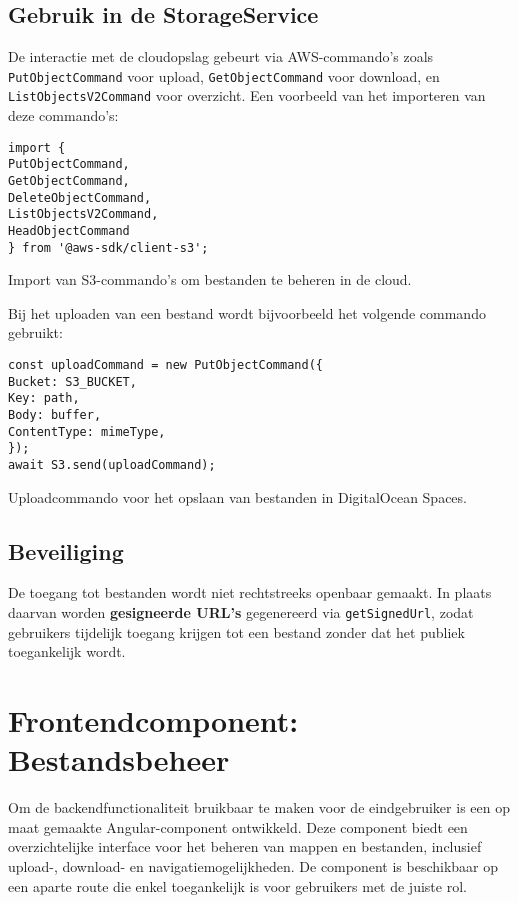 \subsection{Gebruik in de StorageService}
De interactie met de cloudopslag gebeurt via AWS-commando's zoals \texttt{PutObjectCommand} voor upload, \texttt{GetObjectCommand} voor download, en \texttt{ListObjectsV2Command} voor overzicht. Een voorbeeld van het importeren van deze commando's:
\begin{listing}[H]
\begin{verbatim}
import {
PutObjectCommand,
GetObjectCommand,
DeleteObjectCommand,
ListObjectsV2Command,
HeadObjectCommand
} from '@aws-sdk/client-s3';
\end{verbatim}
\caption[Import van S3-commando's]{Import van S3-commando's om bestanden te beheren in de cloud.}
\end{listing}
Bij het uploaden van een bestand wordt bijvoorbeeld het volgende commando gebruikt:
\begin{listing}[H]
\begin{verbatim}
const uploadCommand = new PutObjectCommand({
Bucket: S3_BUCKET,
Key: path,
Body: buffer,
ContentType: mimeType,
});
await S3.send(uploadCommand);
\end{verbatim}
\caption[Uploaden van bestanden naar S3]{Uploadcommando voor het opslaan van bestanden in DigitalOcean Spaces.}
\end{listing}
\subsection{Beveiliging}
De toegang tot bestanden wordt niet rechtstreeks openbaar gemaakt. In plaats daarvan worden \textbf{gesigneerde URL's} gegenereerd via \texttt{getSignedUrl}, zodat gebruikers tijdelijk toegang krijgen tot een bestand zonder dat het publiek toegankelijk wordt.
\section{Frontendcomponent: Bestandsbeheer}
\label{sec:frontend-component}
Om de backendfunctionaliteit bruikbaar te maken voor de eindgebruiker is een op maat gemaakte Angular-component ontwikkeld. Deze component biedt een overzichtelijke interface voor het beheren van mappen en bestanden, inclusief upload-, download- en navigatiemogelijkheden. De component is beschikbaar op een aparte route die enkel toegankelijk is voor gebruikers met de juiste rol.
